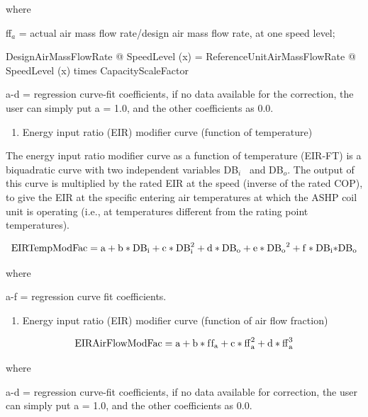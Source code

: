 where

ff\(_{a}\) = actual air mass flow rate/design air mass flow rate, at one speed level;

DesignAirMassFlowRate @ SpeedLevel (x) = ReferenceUnitAirMassFlowRate @ SpeedLevel (x) times CapacityScaleFactor

a-d = regression curve-fit coefficients, if no data available for the correction, the user can simply put a = 1.0, and the other coefficients as 0.0.

\begin{enumerate}
\def\labelenumi{\arabic{enumi})}
\setcounter{enumi}{2}
\tightlist
\item
  Energy input ratio (EIR) modifier curve (function of temperature)
\end{enumerate}

The energy input ratio modifier curve as a function of temperature (EIR-FT) is a biquadratic curve with two independent variables DB\(_{i}\)~ and DB\(_{o}\). The output of this curve is multiplied by the rated EIR at the speed (inverse of the rated COP), to give the EIR at the specific entering air temperatures at which the ASHP coil unit is operating (i.e., at temperatures different from the rating point temperatures).

\begin{equation}
{\rm{EIRTempModFac}} = {\rm{a}} + {\rm{b*D}}{{\rm{B}}_{\rm{i}}} + {\rm{c*DB}}_{\rm{i}}^2 + {\rm{d*D}}{{\rm{B}}_{\rm{o}}} + {\rm{e*D}}{{\rm{B}}_{\rm{o}}}^2 + {\rm{f*D}}{{\rm{B}}_{\rm{i}}}{\rm{*D}}{{\rm{B}}_{\rm{o}}}
\end{equation}

where

a-f = regression curve fit coefficients.

\begin{enumerate}
\def\labelenumi{\arabic{enumi})}
\setcounter{enumi}{3}
\tightlist
\item
  Energy input ratio (EIR) modifier curve (function of air flow fraction)
\end{enumerate}

\begin{equation}
{\rm{EIRAirFlowModFac}} = {\rm{a}} + {\rm{b*f}}{{\rm{f}}_{\rm{a}}} + {\rm{c*ff}}_{\rm{a}}^2 + {\rm{d*ff}}_{\rm{a}}^3
\end{equation}

where

a-d = regression curve-fit coefficients, if no data available for correction, the user can simply put a = 1.0, and the other coefficients as 0.0.

